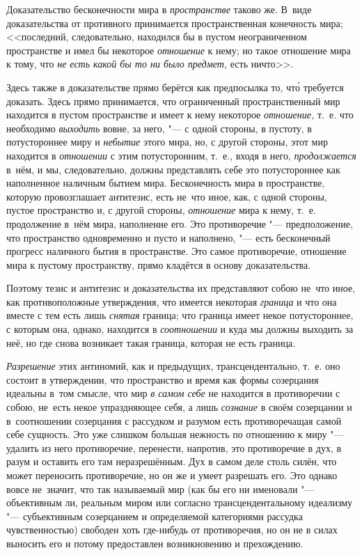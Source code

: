 Доказательство бесконечности мира в {\em пространстве} таково же. В~виде
доказательства от противного принимается пространственная конечность мира;
<<последний, следовательно, находился бы в пустом неограниченном пространстве
и имел бы некоторое {\em отношение} к нему; но такое отношение мира к тому, что
{\em не есть какой бы то ни было предмет,} есть ничто>>.

Здесь также в доказательстве прямо берётся как предпосылка то, чт\'{о} требуется
доказать. Здесь прямо принимается, что ограниченный пространственный мир
находится в пустом пространстве и имеет к нему некоторое {\em отношение,} т.~е.
что необходимо {\em выходить} вовне, за него, "--- с одной стороны, в пустоту,
в потустороннее миру и {\em небытие} этого мира, но, с другой стороны, этот мир
находится в {\em отношении} с этим потусторонним, т.~е., входя в него,
{\em продолжается} в~нём, и мы, следовательно, должны представлять себе это
потустороннее как наполненное наличным бытием мира. Бесконечность мира в
пространстве, которую провозглашает антитезис, есть не~что иное, как, с одной
стороны, пустое пространство и, с другой стороны, {\em отношение} мира к нему,
т.~е. продолжение в~нём мира, наполнение его. Это противоречие "--- предположение,
что пространство одновременно и пусто и наполнено, "--- есть бесконечный прогресс
наличного бытия в пространстве. Это самое противоречие, отношение мира к пустому
пространству, прямо кладётся в основу доказательства.

Поэтому тезис и антитезис и доказательства их представляют собою не~что иное,
как противоположные утверждения, что имеется некоторая {\em граница} и что она
вместе с тем есть лишь {\em снятая} граница; что граница имеет некое
потустороннее, с которым она, однако, находится в {\em соотношении} и куда мы
должны выходить за неё, но где снова возникает такая граница, которая не есть
граница.

{\em Разрешение} этих антиномий, как и предыдущих, трансцендентально, т.~е. оно
состоит в утверждении, что пространство и время как формы созерцания идеальны
в~том смысле, что мир {\em в самом себе} не находится в противоречии с собою,
не~есть некое упраздняющее себя, а лишь {\em сознание} в своём созерцании и
в~соотношении созерцания с рассудком и разумом есть противоречащая самой себе
сущность. Это уже слишком большая нежность по отношению к миру "--- удалить из
него противоречие, перенести, напротив, это противоречие в дух, в разум и
оставить его там неразрешённым. Дух в самом деле столь силён, что может
переносить противоречие, но он же и умеет разрешать его. Это однако вовсе
не~значит, что так называемый мир (как бы его ни именовали "--- объективным ли,
реальным миром или согласно трансцендентальному идеализму "--- субъективным
созерцанием и определяемой категориями рассудка чувственностью) свободен хоть
где-нибудь от противоречия, но он не в силах выносить его и потому предоставлен
возникновению и прехождению.

